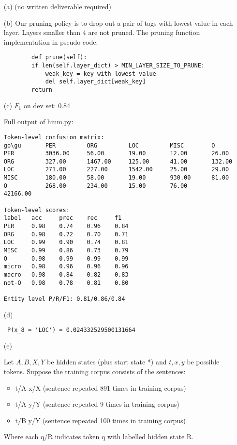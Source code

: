 \documentclass{article}
\begin{document}
\begin{itemize}
    \item[(a)] (no written deliverable required)
    \item[(b)] Our pruning policy is to drop out a pair of tags with lowest value in each layer. Layers smaller than 4 are not pruned. The pruning function implementation in pseudo-code:
    \begin{verbatim}
        def prune(self):
        if len(self.layer_dict) > MIN_LAYER_SIZE_TO_PRUNE:
            weak_key = key with lowest value
            del self.layer_dict[weak_key]
        return
    \end{verbatim}
   
    \item[(c)] $F_1$ on dev set: 0.84
    
    Full output of hmm.py:

    \begin{verbatim}
Token-level confusion matrix:
go\gu   	PER     	ORG     	LOC     	MISC    	O       
PER     	3036.00 	56.00   	19.00   	12.00   	26.00   
ORG     	327.00  	1467.00 	125.00  	41.00   	132.00  
LOC     	271.00  	227.00  	1542.00 	25.00   	29.00   
MISC    	180.00  	58.00   	19.00   	930.00  	81.00   
O       	268.00  	234.00  	15.00   	76.00   	42166.00

Token-level scores:
label	acc  	prec 	rec  	f1   
PER  	0.98 	0.74 	0.96 	0.84 
ORG  	0.98 	0.72 	0.70 	0.71 
LOC  	0.99 	0.90 	0.74 	0.81 
MISC 	0.99 	0.86 	0.73 	0.79 
O    	0.98 	0.99 	0.99 	0.99 
micro	0.98 	0.96 	0.96 	0.96 
macro	0.98 	0.84 	0.82 	0.83 
not-O	0.98 	0.78 	0.81 	0.80 

Entity level P/R/F1: 0.81/0.86/0.84
    \end{verbatim}

    \item[(d)] \begin{verbatim} P(x_8 = 'LOC') = 0.024332529500131664 \end{verbatim}
    \item[(e)]
    
    Let $A, B, X, Y$ be hidden states (plus start state *) and $t, x, y$ be possible tokens.
    Suppose the training corpus consists of the sentences:
    \begin{itemize}
        \item t/A x/X (sentence repeated 891 times in training corpus)
        \item t/A y/Y (sentence repeated 9 times in training corpus)
        \item t/B y/Y (sentence repeated 100 times in training corpus)
    \end{itemize}
    Where each q/R indicates token q with labelled hidden state R.


\end{itemize}
\end{document}
